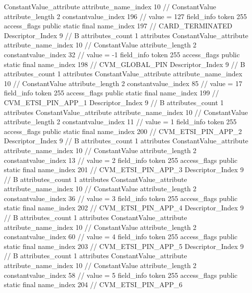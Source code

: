 {{{{{{				ConstantValue_attribute {
					attribute_name_index	10		// ConstantValue
					attribute_length	2
					constantvalue_index	196		// value = 127
				}
				}
			}
			field_info {
				token	255
				access_flags	public static final
				name_index	197		// CARD_TERMINATED
				Descriptor_Index	9		// B
				attributes_count	1
				attributes {
				ConstantValue_attribute {
					attribute_name_index	10		// ConstantValue
					attribute_length	2
					constantvalue_index	32		// value = -1
				}
				}
			}
			field_info {
				token	255
				access_flags	public static final
				name_index	198		// CVM_GLOBAL_PIN
				Descriptor_Index	9		// B
				attributes_count	1
				attributes {
				ConstantValue_attribute {
					attribute_name_index	10		// ConstantValue
					attribute_length	2
					constantvalue_index	85		// value = 17
				}
				}
			}
			field_info {
				token	255
				access_flags	public static final
				name_index	199		// CVM_ETSI_PIN_APP_1
				Descriptor_Index	9		// B
				attributes_count	1
				attributes {
				ConstantValue_attribute {
					attribute_name_index	10		// ConstantValue
					attribute_length	2
					constantvalue_index	11		// value = 1
				}
				}
			}
			field_info {
				token	255
				access_flags	public static final
				name_index	200		// CVM_ETSI_PIN_APP_2
				Descriptor_Index	9		// B
				attributes_count	1
				attributes {
				ConstantValue_attribute {
					attribute_name_index	10		// ConstantValue
					attribute_length	2
					constantvalue_index	13		// value = 2
				}
				}
			}
			field_info {
				token	255
				access_flags	public static final
				name_index	201		// CVM_ETSI_PIN_APP_3
				Descriptor_Index	9		// B
				attributes_count	1
				attributes {
				ConstantValue_attribute {
					attribute_name_index	10		// ConstantValue
					attribute_length	2
					constantvalue_index	36		// value = 3
				}
				}
			}
			field_info {
				token	255
				access_flags	public static final
				name_index	202		// CVM_ETSI_PIN_APP_4
				Descriptor_Index	9		// B
				attributes_count	1
				attributes {
				ConstantValue_attribute {
					attribute_name_index	10		// ConstantValue
					attribute_length	2
					constantvalue_index	60		// value = 4
				}
				}
			}
			field_info {
				token	255
				access_flags	public static final
				name_index	203		// CVM_ETSI_PIN_APP_5
				Descriptor_Index	9		// B
				attributes_count	1
				attributes {
				ConstantValue_attribute {
					attribute_name_index	10		// ConstantValue
					attribute_length	2
					constantvalue_index	58		// value = 5
				}
				}
			}
			field_info {
				token	255
				access_flags	public static final
				name_index	204		// CVM_ETSI_PIN_APP_6
}}}}}

